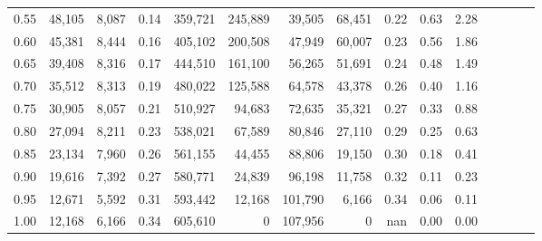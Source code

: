 \begin{tabular}{rrrcrrrrrrrrrrr}
0.55 &  48,105 &  8,087 &                                       0.14 &  359,721 &  245,889 &   39,505 &   68,451 &  0.22 &  0.63 &                         2.28 \\
0.60 &  45,381 &  8,444 &                                       0.16 &  405,102 &  200,508 &   47,949 &   60,007 &  0.23 &  0.56 &                         1.86 \\
0.65 &  39,408 &  8,316 &                                       0.17 &  444,510 &  161,100 &   56,265 &   51,691 &  0.24 &  0.48 &                         1.49 \\
0.70 &  35,512 &  8,313 &                                       0.19 &  480,022 &  125,588 &   64,578 &   43,378 &  0.26 &  0.40 &                         1.16 \\
0.75 &  30,905 &  8,057 &                                       0.21 &  510,927 &   94,683 &   72,635 &   35,321 &  0.27 &  0.33 &                         0.88 \\
0.80 &  27,094 &  8,211 &                                       0.23 &  538,021 &   67,589 &   80,846 &   27,110 &  0.29 &  0.25 &                         0.63 \\
0.85 &  23,134 &  7,960 &                                       0.26 &  561,155 &   44,455 &   88,806 &   19,150 &  0.30 &  0.18 &                         0.41 \\
0.90 &  19,616 &  7,392 &                                       0.27 &  580,771 &   24,839 &   96,198 &   11,758 &  0.32 &  0.11 &                         0.23 \\
0.95 &  12,671 &  5,592 &                                       0.31 &  593,442 &   12,168 &  101,790 &    6,166 &  0.34 &  0.06 &                         0.11 \\
1.00 &  12,168 &  6,166 &                                       0.34 &  605,610 &        0 &  107,956 &        0 &   nan &  0.00 &                         0.00 \\
\bottomrule
\end{tabular}
